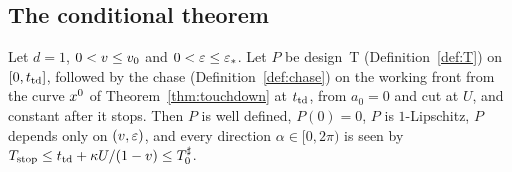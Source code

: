 \subsection{The conditional theorem}

\begin{proposition}\label{prop:cond}
Let $d=1$, $0<v\le v_0$ and $0<\varepsilon\le\varepsilon_*$. Let $P$ be design~T (Definition~\ref{def:T}) on $[0,t_{\mathrm{td}}]$, followed by the chase
(Definition~\ref{def:chase}) on the working front from the curve $x^0$ of Theorem~\ref{thm:touchdown} at $t_{\mathrm{td}}$, from $a_0=0$ and cut
at $U$, and constant after it stops. Then $P$ is well defined, $P(0)=0$, $P$ is $1$-Lipschitz, $P$ depends only on $(v,\varepsilon)$,
and every direction $\alpha\in[0,2\pi)$ is seen by $T_{\mathrm{stop}}\le t_{\mathrm{td}}+\kappa U/(1-v)\le T_0^\sharp$.
\end{proposition}

